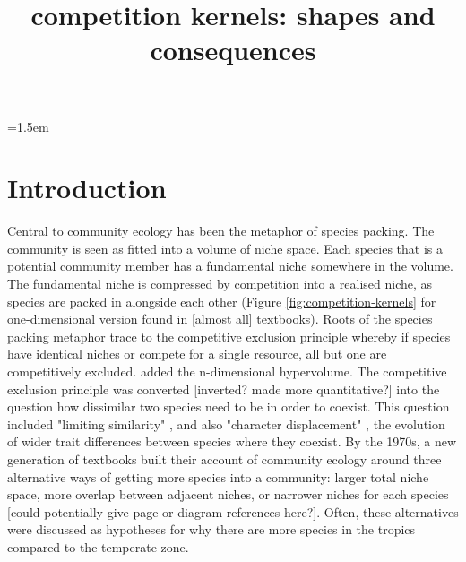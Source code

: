 \documentclass[a4paper,11pt]{article}
\title{competition kernels: shapes and consequences}
\author{}
\date{}
\affiliation{}
\begin{document}

\parindent=1.5em
\addtolength{\parskip}{.3em}


\section{Introduction}

Central to community ecology has been the metaphor of species packing. The community is seen as fitted into a volume of niche space. Each species that is a potential community member has a fundamental niche somewhere in the volume. The fundamental niche is compressed by competition into a realised niche, as species are packed in alongside each other (Figure \ref{fig:competition-kernels} for one-dimensional version found in [almost all] textbooks). Roots of the species packing metaphor trace to the competitive exclusion principle \cite{Lotka-1925, Volterra-1926, Gause-1934} whereby if species have identical niches or compete for a single resource, all but one are competitively excluded. \citet{Hutchinson-1957} added the n-dimensional hypervolume. The  competitive exclusion principle was converted [inverted? made more quantitative?] into the question how dissimilar two species need to be in order to coexist. This question included "limiting similarity" \citep{MacArthur-1967}, and also "character displacement" \citep{brown-1956}, the evolution of wider trait differences between species where they coexist. By the 1970s, a new generation of textbooks \citep{Whittaker-1970,Krebs-1972,Ricklefs-1973,pianka-1974} built their account of community ecology around three alternative ways of getting more species into a community: larger total niche space, more overlap between adjacent niches, or narrower niches for each species [could potentially give page or diagram references here?]. Often, these alternatives were discussed as hypotheses for why there are more species in the tropics compared to the temperate zone.

\end{document}
